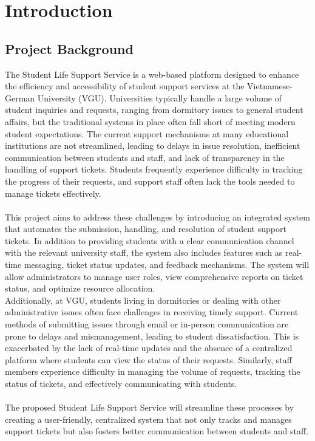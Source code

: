 \section{Introduction}

\subsection{Project Background}

The Student Life Support Service is a web-based platform designed to enhance the efficiency and accessibility of student support services at the Vietnamese-German University (VGU). Universities typically handle a large volume of student inquiries and requests, ranging from dormitory issues to general student affairs, but the traditional systems in place often fall short of meeting modern student expectations. The current support mechanisms at many educational institutions are not streamlined, leading to delays in issue resolution, inefficient communication between students and staff, and lack of transparency in the handling of support tickets. Students frequently experience difficulty in tracking the progress of their requests, and support staff often lack the tools needed to manage tickets effectively. \\ \\
This project aims to address these challenges by introducing an integrated system that automates the submission, handling, and resolution of student support tickets. In addition to providing students with a clear communication channel with the relevant university staff, the system also includes features such as real-time messaging, ticket status updates, and feedback mechanisms. The system will allow administrators to manage user roles, view comprehensive reports on ticket status, and optimize resource allocation. \\

Additionally, at VGU, students living in dormitories or dealing with other administrative issues often face challenges in receiving timely support. Current methods of submitting issues through email or in-person communication are prone to delays and mismanagement, leading to student dissatisfaction. This is exacerbated by the lack of real-time updates and the absence of a centralized platform where students can view the status of their requests. Similarly, staff members experience difficulty in managing the volume of requests, tracking the status of tickets, and effectively communicating with students. \\ \\
The proposed Student Life Support Service will streamline these processes by creating a user-friendly, centralized system that not only tracks and manages support tickets but also fosters better communication between students and staff.


